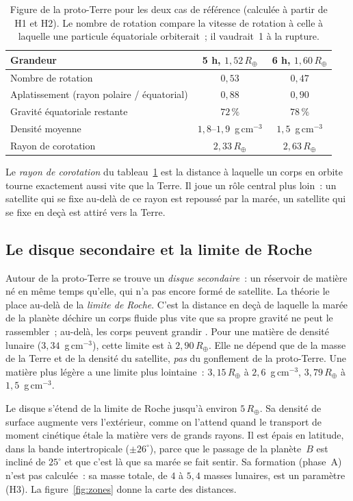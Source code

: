 \documentclass[11pt,a4paper]{article}
\newcommand{\Rt}{\ensuremath{R_\oplus}}
\begin{document}
\begin{table}[htbp]
\centering
\caption{Figure de la proto-Terre pour les deux cas de référence (calculée à partir de H1 et H2). Le nombre de rotation compare la vitesse de rotation à celle à laquelle une particule équatoriale orbiterait~; il vaudrait~1 à la rupture.\label{tab:forme}}
\small
\begin{tabular}{lcc}
\toprule
Grandeur & 5 h, $1{,}52\,\Rt$ & 6 h, $1{,}60\,\Rt$ \\
\midrule
Nombre de rotation & $0{,}53$ & $0{,}47$ \\
Aplatissement (rayon polaire / équatorial) & $0{,}88$ & $0{,}90$ \\
Gravité équatoriale restante & $72\,\%$ & $78\,\%$ \\
Densité moyenne & $1{,}8$--$1{,}9$~g\,cm$^{-3}$ & $1{,}5$~g\,cm$^{-3}$ \\
Rayon de corotation & $2{,}33\,\Rt$ & $2{,}63\,\Rt$ \\
\bottomrule
\end{tabular}
\end{table}

Le \emph{rayon de corotation} du tableau~\ref{tab:forme} est la distance à laquelle un corps en orbite tourne exactement aussi vite que la Terre. Il joue un rôle central plus loin~: un satellite qui se fixe au-delà de ce rayon est repoussé par la marée, un satellite qui se fixe en deçà est attiré vers la Terre.

\subsection{Le disque secondaire et la limite de Roche}
\label{sec:roche}

Autour de la proto-Terre se trouve un \emph{disque secondaire}~: un réservoir de matière né en même temps qu'elle, qui n'a pas encore formé de satellite. La théorie le place au-delà de la \emph{limite de Roche}. C'est la distance en deçà de laquelle la marée de la planète déchire un corps fluide plus vite que sa propre gravité ne peut le rassembler~; au-delà, les corps peuvent grandir \citep{SalmonCanup2012}. Pour une matière de densité lunaire ($3{,}34$~g\,cm$^{-3}$), cette limite est à $2{,}90\,\Rt$. Elle ne dépend que de la masse de la Terre et de la densité du satellite, \emph{pas} du gonflement de la proto-Terre. Une matière plus légère a une limite plus lointaine~: $3{,}15\,\Rt$ à $2{,}6$~g\,cm$^{-3}$, $3{,}79\,\Rt$ à $1{,}5$~g\,cm$^{-3}$.

Le disque s'étend de la limite de Roche jusqu'à environ $5\,\Rt$. Sa densité de surface augmente vers l'extérieur, comme on l'attend quand le transport de moment cinétique étale la matière vers de grands rayons. Il est épais en latitude, dans la bande intertropicale ($\pm26^\circ$), parce que le passage de la planète~$B$ est incliné de $25^\circ$ et que c'est là que sa marée se fait sentir. Sa formation (phase~A) n'est pas calculée~: sa masse totale, de $4$ à $5{,}4$ masses lunaires, est un paramètre (H3). La figure~\ref{fig:zones} donne la carte des distances.
\end{document}
